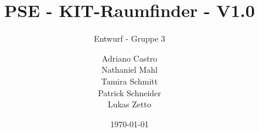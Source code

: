 \title{
    PSE - KIT-Raumfinder - V1.0
}
\subtitle{Entwurf - Gruppe 3}
\author{
    Adriano Castro \\
    Nathaniel Mahl \\
    Tamira Schmitt \\
    Patrick Schneider \\
    Lukas Zetto
}

\date{\today}

\maketitle